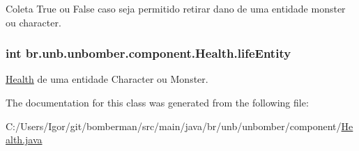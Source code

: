 Coleta True ou False caso seja permitido retirar dano de uma entidade monster ou character. 

\hypertarget{classbr_1_1unb_1_1unbomber_1_1component_1_1_health_a93d456b8797d84a40e9640889b37161b}{
\subsubsection[{life\+Entity}]{\setlength{\rightskip}{0pt plus 5cm}int br.\+unb.\+unbomber.\+component.\+Health.\+life\+Entity\hspace{0.3cm}{\ttfamily [private]}}}\label{classbr_1_1unb_1_1unbomber_1_1component_1_1_health_a93d456b8797d84a40e9640889b37161b}


\hyperlink{classbr_1_1unb_1_1unbomber_1_1component_1_1_health}{Health} de uma entidade Character ou Monster. 



The documentation for this class was generated from the following file\+:\begin{DoxyCompactItemize}
\item 
C\+:/\+Users/\+Igor/git/bomberman/src/main/java/br/unb/unbomber/component/\hyperlink{_health_8java}{Health.\+java}\end{DoxyCompactItemize}
